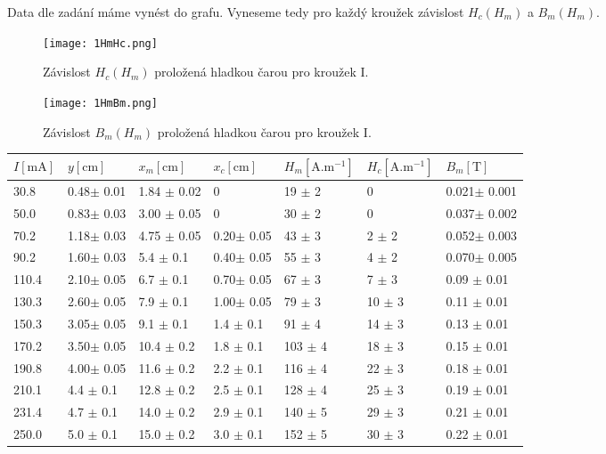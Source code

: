 \documentclass{article}
\begin{document}
\par Data dle zadání máme vynést do grafu. Vyneseme tedy pro každý kroužek závislost $H_c(H_m)$ a $B_m(H_m)$.
\begin{figure}[h!]
\centering
\texttt{[image: 1HmHc.png]}
\caption{Závislost $H_c(H_m)$ proložená hladkou čarou pro kroužek I.}
\end{figure}
\begin{figure}[h!]
\centering
\texttt{[image: 1HmBm.png]}
\caption{Závislost $B_m(H_m)$ proložená hladkou čarou pro kroužek I.}
\end{figure}
\newpage

\begin{center}
    \label{tab:title} 
    \begin{tabular}[h!]{| l | l | l | l | l | l | l |}
    \hline
    $I [\mathrm{mA}]$ & $y [\mathrm{cm}]$ & $x_m [\mathrm{cm}]$ & $x_c [\mathrm{cm}]$ & $H_m [\mathrm{A.m^{-1}}]$ & $H_c [\mathrm{A.m^{-1}}]$ & $B_m [\mathrm{T}]$ \\ \hline \hline
    30.8  & 0.48$\pm$ 0.01& 1.84 $\pm$ 0.02& 0              & 19 $\pm$ 2   & 0            & 0.021$\pm$ 0.001\\ \hline
    50.0  & 0.83$\pm$ 0.03& 3.00 $\pm$ 0.05& 0              & 30 $\pm$ 2   & 0            & 0.037$\pm$ 0.002\\ \hline
    70.2  & 1.18$\pm$ 0.03& 4.75 $\pm$ 0.05& 0.20$\pm$ 0.05 & 43 $\pm$ 3   & 2  $\pm$ 2   & 0.052$\pm$ 0.003\\ \hline
    90.2  & 1.60$\pm$ 0.03& 5.4  $\pm$ 0.1 & 0.40$\pm$ 0.05 & 55   $\pm$ 3   & 4  $\pm$ 2   & 0.070$\pm$ 0.005\\ \hline
    110.4 & 2.10$\pm$ 0.05& 6.7  $\pm$ 0.1 & 0.70$\pm$ 0.05 & 67   $\pm$ 3   & 7  $\pm$ 3   & 0.09 $\pm$ 0.01 \\ \hline
    130.3 & 2.60$\pm$ 0.05& 7.9  $\pm$ 0.1 & 1.00$\pm$ 0.05 & 79   $\pm$ 3   & 10 $\pm$ 3   & 0.11 $\pm$ 0.01 \\ \hline
    150.3 & 3.05$\pm$ 0.05& 9.1  $\pm$ 0.1 & 1.4 $\pm$ 0.1  & 91   $\pm$ 4   & 14 $\pm$ 3   & 0.13 $\pm$ 0.01 \\ \hline
    170.2 & 3.50$\pm$ 0.05& 10.4 $\pm$ 0.2 & 1.8 $\pm$ 0.1  & 103  $\pm$ 4   & 18 $\pm$ 3   & 0.15 $\pm$ 0.01 \\ \hline
    190.8 & 4.00$\pm$ 0.05& 11.6 $\pm$ 0.2 & 2.2 $\pm$ 0.1  & 116  $\pm$ 4   & 22 $\pm$ 3   & 0.18 $\pm$ 0.01 \\ \hline
    210.1 & 4.4 $\pm$ 0.1 & 12.8 $\pm$ 0.2 & 2.5 $\pm$ 0.1  & 128  $\pm$ 4   & 25 $\pm$ 3   & 0.19 $\pm$ 0.01 \\ \hline
    231.4 & 4.7 $\pm$ 0.1 & 14.0 $\pm$ 0.2 & 2.9 $\pm$ 0.1  & 140  $\pm$ 5   & 29 $\pm$ 3   & 0.21 $\pm$ 0.01 \\ \hline
    250.0 & 5.0 $\pm$ 0.1 & 15.0 $\pm$ 0.2 & 3.0 $\pm$ 0.1  & 152  $\pm$ 5   & 30 $\pm$ 3   & 0.22 $\pm$ 0.01 \\ \hline
    \end{tabular}
\end{center}
\end{document}
